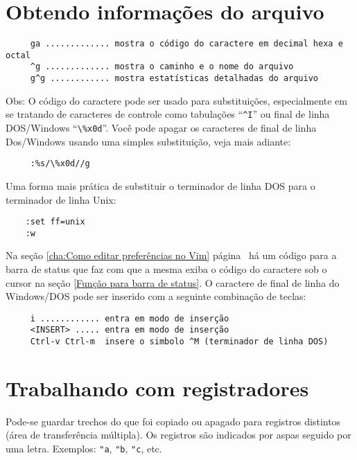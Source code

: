 \section{Obtendo informações do arquivo}

\begin{verbatim}
     ga ............. mostra o código do caractere em decimal hexa e octal
     ^g ............. mostra o caminho e o nome do arquivo
     g^g ............ mostra estatísticas detalhadas do arquivo
\end{verbatim}

Obs: O código do caractere pode ser usado para substituições,
especialmente em se tratando de caracteres de controle como tabulações
``\verb|^I|'' ou final de linha DOS/Windows ``\verb|\%x0d|''. Você pode apagar os
caracteres de final de linha Dos/Windows usando uma simples
substituição, veja mais adiante:

\begin{verbatim}
     :%s/\%x0d//g
\end{verbatim}

Uma forma mais prática de substituir o terminador de linha DOS para o
terminador de linha Unix:

\begin{verbatim}
    :set ff=unix
    :w
\end{verbatim}

Na seção \ref{cha:Como editar preferências no Vim}
página~\pageref{cha:Como editar preferências no Vim}
há um código para a barra de
status que faz com que a mesma exiba o código do caractere sob o cursor na
seção \ref{Função para barra de status}. {\Large {}} O caractere de final de linha
do Windows/DOS pode ser inserido com a seguinte combinação de teclas:

\begin{verbatim}
     i ............ entra em modo de inserção
     <INSERT> ..... entra em modo de inserção
     Ctrl-v Ctrl-m  insere o simbolo ^M (terminador de linha DOS)
\end{verbatim}

\section{Trabalhando com registradores}
\label{Trabalhando com registradores}

Pode-se guardar trechos do que foi copiado ou apagado para
registros distintos (área de transferência múltipla).
Os registros são indicados por aspas seguido por uma letra.
Exemplos: {\tt "a}, {\tt "b}, {\tt "c}, etc.


